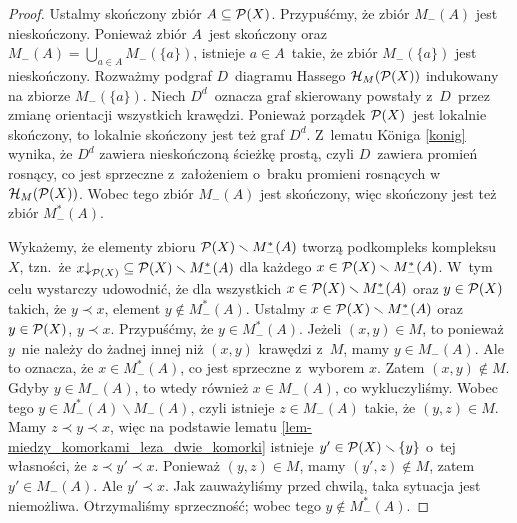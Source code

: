 \begin{proof}
Ustalmy skończony zbiór $A\subseteq \mathcal{P}(X)$. Przypuśćmy, że zbiór $M_-(A)$ jest nieskończony. Ponieważ zbiór $A$~jest skończony oraz $M_{-}(A)=\bigcup_{a\in A}M_{-}(\{a\})$, istnieje $a\in A$~takie, że zbiór $M_{-}(\{a\})$ jest nieskończony. Rozważmy podgraf $D$~diagramu Hassego $\mathcal{H}_M(\mathcal{P}(X))$ indukowany na zbiorze $M_-(\{a\})$. Niech $D^{d}$~oznacza graf skierowany powstały z~$D$~przez zmianę orientacji wszystkich krawędzi. Ponieważ porządek $\mathcal{P}(X)$~jest lokalnie skończony, to lokalnie skończony jest też graf $D^{d}$. Z~lematu K\"oniga \ref{konig} wynika, że $D^{d}$ zawiera nieskończoną ścieżkę prostą, czyli $D$~zawiera promień rosnący, co jest sprzeczne z~założeniem o~braku promieni rosnących w~$\mathcal{H}_M(\mathcal{P}(X))$. Wobec tego zbiór $M_-(A)$ jest skończony, więc skończony jest też zbiór $M_-^*(A)$.

Wykażemy, że elementy zbioru $\mathcal{P}(X)\smallsetminus M_-^*(A)$ tworzą podkompleks kompleksu $X$, tzn.~że $x\mathord{\downarrow}_{\mathcal{P}(X)}\subseteq \mathcal{P}(X)\smallsetminus M_-^*(A)$ dla każdego $x\in \mathcal{P}(X)\smallsetminus M_-^*(A)$. W~tym celu wystarczy udowodnić, że dla wszystkich $x\in \mathcal{P}(X)\smallsetminus M_-^*(A)$ oraz $y\in\mathcal{P}(X)$ takich, że $y\prec x$, element $y\not\in M_-^*(A)$. Ustalmy $x\in \mathcal{P}(X)\smallsetminus M_-^*(A)$ oraz $y\in\mathcal{P}(X)$, $y\prec x$. Przypuśćmy, że $y\in M_-^*(A)$. Jeżeli $(x,y)\in M$, to ponieważ $y$~nie należy do żadnej innej niż $(x,y)$ krawędzi z~$M$, mamy $y\in M_-(A)$. Ale to oznacza, że $x\in M_-^*(A)$, co jest sprzeczne z~wyborem $x$. Zatem $(x,y)\not\in M$. Gdyby $y\in M_-(A)$, to wtedy również $x\in M_-(A)$, co wykluczyliśmy. Wobec tego $y\in M_-^*(A)\smallsetminus M_-(A)$, czyli istnieje $z\in M_-(A)$ takie, że $(y,z)\in M$. Mamy $z\prec y\prec x$, więc na podstawie lematu \ref{lem-miedzy_komorkami_leza_dwie_komorki} istnieje $y'\in\mathcal{P}(X)\smallsetminus\{y\}$ o~tej własności, że $z\prec y'\prec x$. Ponieważ $(y,z)\in M$, mamy $(y',z)\not\in M$, zatem $y'\in M_-(A)$. Ale $y'\prec x$. Jak zauważyliśmy przed chwilą, taka sytuacja jest niemożliwa. Otrzymaliśmy sprzeczność; wobec tego $y\not\in M_{-}^*(A)$.
\end{proof}

